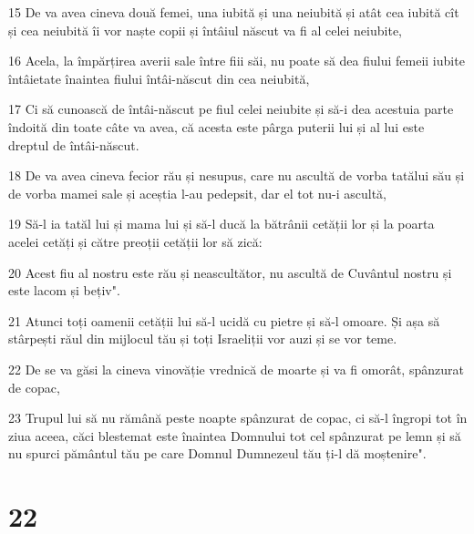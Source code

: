 \par 15 De va avea cineva două femei, una iubită și una neiubită și atât cea iubită cît și cea neiubită îi vor naște copii și întâiul născut va fi al celei neiubite,
\par 16 Acela, la împărțirea averii sale între fiii săi, nu poate să dea fiului femeii iubite întâietate înaintea fiului întâi-născut din cea neiubită,
\par 17 Ci să cunoască de întâi-născut pe fiul celei neiubite și să-i dea acestuia parte îndoită din toate câte va avea, că acesta este pârga puterii lui și al lui este dreptul de întâi-născut.
\par 18 De va avea cineva fecior rău și nesupus, care nu ascultă de vorba tatălui său și de vorba mamei sale și aceștia l-au pedepsit, dar el tot nu-i ascultă,
\par 19 Să-l ia tatăl lui și mama lui și să-l ducă la bătrânii cetății lor și la poarta acelei cetăți și către preoții cetății lor să zică:
\par 20 Acest fiu al nostru este rău și neascultător, nu ascultă de Cuvântul nostru și este lacom și bețiv".
\par 21 Atunci toți oamenii cetății lui să-l ucidă cu pietre și să-l omoare. Și așa să stârpești răul din mijlocul tău și toți Israeliții vor auzi și se vor teme.
\par 22 De se va găsi la cineva vinovăție vrednică de moarte și va fi omorât, spânzurat de copac,
\par 23 Trupul lui să nu rămână peste noapte spânzurat de copac, ci să-l îngropi tot în ziua aceea, căci blestemat este înaintea Domnului tot cel spânzurat pe lemn și să nu spurci pământul tău pe care Domnul Dumnezeul tău ți-l dă moștenire".

\chapter{22}

